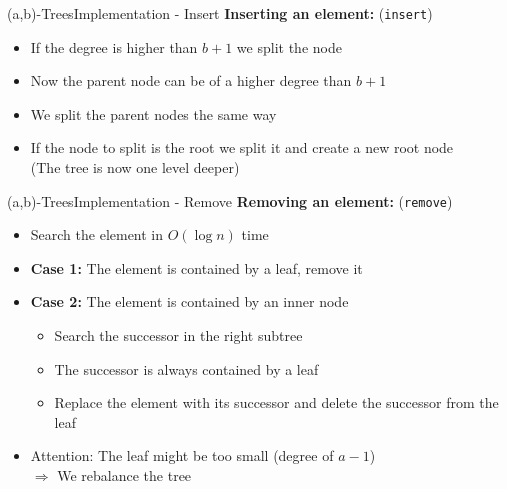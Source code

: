 \begin{frame}{(a,b)-Trees}{Implementation - Insert}
  \textbf{Inserting an element:} (\texttt{\color{Mittel-Blau}insert})
  \begin{itemize}
    \item<2->
      If the degree is higher than {\color{Mittel-Blau}$b+1$}
      we split the node
    \item<3->
      Now the parent node can be of a higher degree than
      {\color{Mittel-Blau}$b+1$}
    \item<4->
      We {\color{Mittel-Blau}split} the parent nodes the same way
    \item<5->
      If the node to split is the root we split it and create a new root node\\
      (The tree is now one level deeper)
  \end{itemize}
\end{frame}


\begin{frame}{(a,b)-Trees}{Implementation - Remove}
  \textbf{Removing an element:} (\texttt{\color{Mittel-Blau}remove})
  \begin{itemize}
    \item<2->
      Search the element in {\color{Mittel-Blau}$O(\log n)$} time
    \item<3->
      \textbf{Case 1:}
      The element is contained by a leaf, remove it
    \item<4->
      \textbf{Case 2:}
      The element is contained by an inner node
      \begin{itemize}
        \item<5->
          Search the {\color{Mittel-Blau}successor} in the right subtree
        \item<6->
          The {\color{Mittel-Blau}successor} is always contained by a leaf
        \item<7->
          Replace the element with its {\color{Mittel-Blau}successor} and
          delete the {\color{Mittel-Blau}successor} from the leaf
      \end{itemize}
    \item<8->
      {\color{cyan}Attention:} The leaf might be too small (degree of {\color{Mittel-Blau}$a-1$})\\
      $\Rightarrow$ We {\color{Mittel-Blau}rebalance} the tree
  \end{itemize}
\end{frame}

